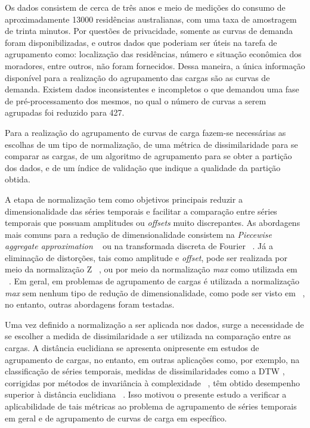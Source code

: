 Os dados consistem de cerca de três anos e meio de medições do consumo de aproximadamente 13000 residências australianas, com uma taxa de amostragem de trinta minutos. Por questões de privacidade, somente as curvas de demanda foram disponibilizadas, e outros dados que poderiam ser úteis na tarefa de agrupamento como: localização das residências, número e situação econômica dos moradores, entre outros, não foram fornecidos. Dessa maneira, a única informação disponível para a realização do agrupamento das cargas são as curvas de demanda. Existem dados inconsistentes e incompletos o que demandou uma fase de pré-processamento dos mesmos, no qual o número de curvas a serem agrupadas foi reduzido para 427.

Para a realização do agrupamento de curvas de carga fazem-se necessárias as escolhas de um tipo de normalização, de uma métrica de dissimilaridade para se comparar as cargas, de um algoritmo de agrupamento para se obter a partição dos dados, e de um índice de validação que indique a qualidade da partição obtida. 

A etapa de normalização tem como objetivos principais reduzir a dimensionalidade das séries temporais e  facilitar a comparação entre séries temporais que possuam amplitudes ou \emph{offsets} muito discrepantes. As abordagens mais comuns para a redução de dimensionalidade consistem na \emph{Piecewise aggregate approximation} ~\parencite{SAX} ou na transformada discreta de Fourier ~\parencite{FFT}. Já a eliminação de distorções, tais como amplitude e \emph{offset}, pode ser realizada por meio da normalização Z ~\parencite{trillions}, ou por meio da normalização \emph{max} como utilizada em ~\parencite{Chicco}. Em geral, em problemas de agrupamento de cargas é utilizada a normalização \emph{max} sem nenhum tipo de redução de dimensionalidade, como pode ser visto em ~\parencite{Chicco, Flath2012,Tsekouras20081494}, no entanto, outras abordagens foram testadas.

Uma vez definido a normalização a ser aplicada nos dados, surge a necessidade de se escolher a medida de dissimilaridade a ser utilizada na comparação entre as cargas. A distância euclidiana se apresenta onipresente em estudos de agrupamento de cargas, no entanto, em outras aplicações como, por exemplo, na classificação de séries temporais, medidas de dissimilaridades como a DTW \parencite{DTW}, corrigidas por métodos de invariância à complexidade ~\parencite{CID}, têm obtido desempenho superior à distância euclidiana ~\parencite{BatistaComparativo}. Isso motivou o presente estudo a verificar a aplicabilidade de tais métricas ao problema de agrupamento de séries temporais em geral e de agrupamento de curvas de carga em específico.

